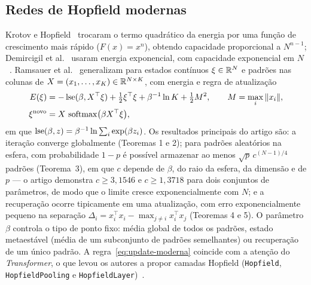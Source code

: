 \subsection{Redes de Hopfield modernas}\label{sec:moderna}
Krotov e Hopfield~\cite{krotov2016} trocaram o termo quadrático da energia por uma função de crescimento mais
rápido ($F(x)=x^n$), obtendo capacidade proporcional a $N^{n-1}$; Demircigil et al.~\cite{demircigil2017}
usaram energia exponencial, com capacidade exponencial em $N$~\cite{wikihopfield}. Ramsauer
et al.~\cite{ramsauer2021} generalizam para estados contínuos $\xi\in\mathbb{R}^N$ e padrões nas colunas de
$X=(x_1,\dots,x_K)\in\mathbb{R}^{N\times K}$, com energia e regra de atualização
\begin{align}
E(\xi)&=-\operatorname{lse}(\beta,X^{\top}\xi)+\tfrac12\xi^{\top}\xi+\beta^{-1}\ln K+\tfrac12M^2,\qquad M=\max_i\|x_i\|,\label{eq:energia-moderna}\\
\xi^{\text{novo}}&=X\,\operatorname{softmax}\bigl(\beta X^{\top}\xi\bigr),\label{eq:update-moderna}
\end{align}
em que $\operatorname{lse}(\beta,z)=\beta^{-1}\ln\sum_i\exp(\beta z_i)$. Os resultados principais do artigo são: a iteração
converge globalmente (Teoremas 1 e 2); para padrões aleatórios na esfera, com probabilidade $1-p$ é possível
armazenar ao menos $\sqrt p\,c^{(N-1)/4}$ padrões (Teorema~3), em que $c$ depende de $\beta$, do raio da esfera,
da dimensão e de $p$ --- o artigo demonstra $c\ge3{,}1546$ e $c\ge1{,}3718$ para dois conjuntos de parâmetros,
de modo que o limite cresce exponencialmente com $N$; e a recuperação ocorre tipicamente em uma atualização, com
erro exponencialmente pequeno na separação $\Delta_i=x_i^{\top}x_i-\max_{j\neq i}x_i^{\top}x_j$
(Teoremas 4 e 5). O parâmetro $\beta$ controla o tipo de
ponto fixo: média global de todos os padrões, estado metaestável (média de um subconjunto de padrões
semelhantes) ou recuperação de um único padrão. A regra~\eqref{eq:update-moderna} coincide com a atenção do
\emph{Transformer}, o que levou os autores a propor camadas Hopfield (\texttt{Hopfield},
\texttt{HopfieldPooling} e \texttt{HopfieldLayer})~\cite{ramsauer2021,hopfieldlayers}.

